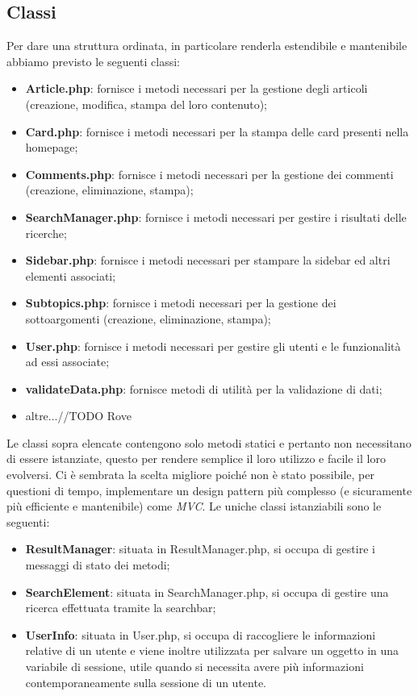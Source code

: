 \documentclass[12pt]{article}
\begin{document}
	\subsection{Classi}
	Per dare una struttura ordinata, in particolare renderla estendibile e mantenibile abbiamo previsto le seguenti classi:
		\begin{itemize}
			\item \textbf{Article.php}: fornisce i metodi necessari per la gestione degli articoli (creazione, modifica, stampa del loro contenuto);
			\item \textbf{Card.php}: fornisce i metodi necessari per la stampa delle card presenti nella homepage;
			\item \textbf{Comments.php}: fornisce i metodi necessari per la gestione dei commenti (creazione, eliminazione, stampa);
			\item \textbf{SearchManager.php}: fornisce i metodi necessari per gestire i risultati delle ricerche;
			\item \textbf{Sidebar.php}: fornisce i metodi necessari per stampare la sidebar ed altri elementi associati;
			\item \textbf{Subtopics.php}: fornisce i metodi necessari per la gestione dei sottoargomenti (creazione, eliminazione, stampa);
			\item \textbf{User.php}: fornisce i metodi necessari per gestire gli utenti e le funzionalità ad essi associate;
			\item \textbf{validateData.php}: fornisce metodi di utilità per la validazione di dati;
			\item altre...//TODO Rove
		\end{itemize}
	Le classi sopra elencate contengono solo metodi statici e pertanto non necessitano di essere istanziate, questo per rendere semplice il loro utilizzo e facile il loro evolversi. Ci è sembrata la scelta migliore poiché non è stato possibile, per questioni di tempo, implementare un design pattern più complesso (e sicuramente più efficiente e mantenibile) come \emph{MVC}.
	Le uniche classi istanziabili sono le seguenti:
	\begin{itemize}
		\item \textbf{ResultManager}: situata in ResultManager.php, si occupa di gestire i messaggi di stato dei metodi;
		\item \textbf{SearchElement}: situata in SearchManager.php, si occupa di gestire una ricerca effettuata tramite la searchbar;
		\item \textbf{UserInfo}: situata in User.php, si occupa di raccogliere le informazioni relative di un utente e viene inoltre utilizzata per salvare un oggetto in una variabile di sessione, utile quando si necessita avere più informazioni contemporaneamente sulla sessione di un utente.
	\end{itemize}
\end{document}
